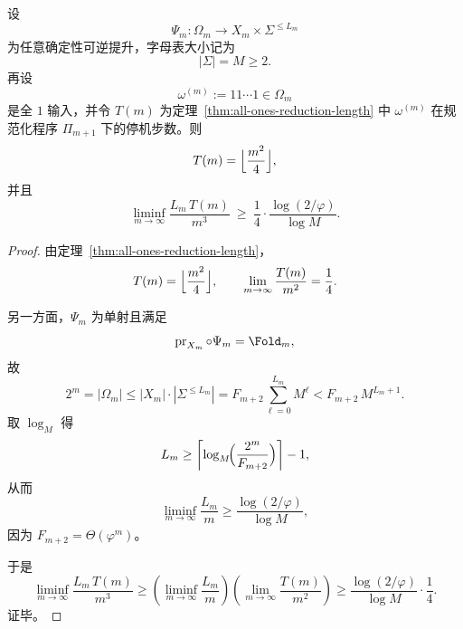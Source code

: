 \begin{theorem}\label{thm:xi-time-part9zp-allones-area-time-cubic-lower-bound}
设
\[
\Psi_m:\Omega_m\to X_m\times \Sigma^{\le L_m}
\]
为任意确定性可逆提升，字母表大小记为
\[
|\Sigma|=M\ge 2.
\]
再设
\[
\omega^{(m)}:=11\cdots 1\in\Omega_m
\]
是全 \(1\) 输入，并令 \(T(m)\) 为定理~\ref{thm:all-ones-reduction-length} 中 \(\omega^{(m)}\) 在规范化程序 \(\Pi_{m+1}\) 下的停机步数。则
\[
T(m)=\Bigl\lfloor \frac{m^2}{4}\Bigr\rfloor,
\]
并且
\[
\liminf_{m\to\infty}\frac{L_m\,T(m)}{m^3}
\ \ge\
\frac{1}{4}\cdot \frac{\log(2/\varphi)}{\log M}.
\]
\end{theorem}
\begin{proof}
由定理~\ref{thm:all-ones-reduction-length}，
\[
T(m)=\Bigl\lfloor \frac{m^2}{4}\Bigr\rfloor,
\qquad
\lim_{m\to\infty}\frac{T(m)}{m^2}=\frac14.
\]

另一方面，\(\Psi_m\) 为单射且满足
\[
\operatorname{pr}_{X_m}\circ \Psi_m=\Fold_m,
\]
故
\[
2^m=|\Omega_m|
\le
|X_m|\cdot |\Sigma^{\le L_m}|
=
F_{m+2}\sum_{\ell=0}^{L_m}M^\ell
<
F_{m+2}\,M^{L_m+1}.
\]
取 \(\log_M\) 得
\[
L_m\ge \left\lceil \log_M\!\Bigl(\frac{2^m}{F_{m+2}}\Bigr)\right\rceil-1,
\]
从而
\[
\liminf_{m\to\infty}\frac{L_m}{m}
\ge
\frac{\log(2/\varphi)}{\log M},
\]
因为 \(F_{m+2}=\Theta(\varphi^m)\)。

于是
\[
\liminf_{m\to\infty}\frac{L_m\,T(m)}{m^3}
\ge
\left(\liminf_{m\to\infty}\frac{L_m}{m}\right)
\left(\lim_{m\to\infty}\frac{T(m)}{m^2}\right)
\ge
\frac{\log(2/\varphi)}{\log M}\cdot \frac14.
\]
证毕。
\end{proof}


